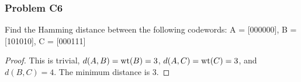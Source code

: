 \documentclass[../../../main.tex]{subfiles}
\begin{document}
\subsubsection{Problem C6}
\begin{wts}
    Find the Hamming distance between the following codewords: A = [000000], B = [101010], C = [000111]
\end{wts}
\begin{proof}
This is trivial, $d(A,B)=\operatorname{wt}(B)=3$, $d(A,C)=\operatorname{wt}(C)=3$, and $d(B,C) = 4$. The minimum distance is $3$. 
\end{proof}
\end{document}
